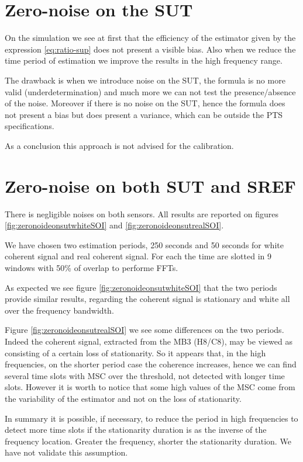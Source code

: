 \section{Zero-noise on the SUT}
On the simulation we see at first that the efficiency of the estimator given by the expression \eqref{eq:ratio-sup} does not present a visible bias. Also when we reduce the time period of estimation we improve the results in the high frequency range.

The drawback is when we introduce noise on the SUT, the formula is no more valid (underdetermination) and much more we can not test the presence/absence of the noise. Moreover if there is no noise on the SUT, hence the formula does not present a bias but does present a variance, which can be outside the PTS specifications.

As a conclusion this approach is not advised for the calibration. 


\section{Zero-noise on both SUT and SREF}
There is negligible noises on both sensors. All results are reported on figures \ref{fig:zeronoideonsutwhiteSOI} and \ref{fig:zeronoideonsutrealSOI}.

We have chosen two estimation periods, 250 seconds and 50 seconds for white coherent signal and real coherent  signal. For each the time are slotted in 9 windows with 50\% of overlap to performe FFTs.

As expected we see figure \ref{fig:zeronoideonsutwhiteSOI} that the two periods provide similar results, regarding the coherent signal is stationary and white all over the frequency bandwidth.

Figure \ref{fig:zeronoideonsutrealSOI} we see some differences on the two periods. Indeed the coherent signal, extracted from the MB3 (H8/C8), may be viewed as consisting of a certain loss of stationarity. So it appears that, in the high frequencies,  on the shorter period case the coherence increases, hence we can find several time slots with MSC over the threshold, not detected with longer time slots. However it is worth to notice that some high values of the MSC come from the variability of the estimator and not on the loss of stationarity.

In summary it is possible, if necessary, to reduce the period in high frequencies to detect more time slots if the stationarity duration is as the inverse of the frequency location. Greater the frequency, shorter the stationarity duration. We have not validate this assumption. 

